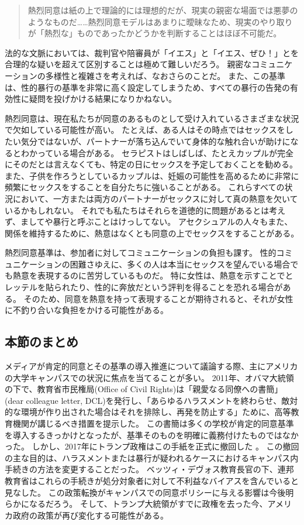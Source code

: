 \documentclass[paper=a4,book,openany]{jlreq} \usepackage{mystyle}
\begin{document}
\begin{quote}
熱烈同意は紙の上で理論的には理想的だが、現実の親密な場面では悪夢のようなものだ……熱烈同意モデルはあまりに曖昧なため、現実のやり取りが「熱烈な」ものであったかどうかを判断することはほぼ不可能だ。
\citep{zheng14:_how_ace_sex}

\end{quote}

法的な文脈においては、裁判官や陪審員が「イエス」と「イエス、ぜひ！」とを合理的な疑いを超えて区別することは極めて難しいだろう。
親密なコミュニケーションの多様性と複雑さを考えれば、なおさらのことだ。
また、この基準は、性的暴行の基準を非常に高く設定してしまうため、すべての暴行の告発の有効性に疑問を投げかける結果になりかねない。

熱烈同意は、現在私たちが同意のあるものとして受け入れているさまざまな状況で欠如している可能性が高い。
たとえば、ある人はその時点ではセックスをしたい気分ではないが、パートナーが落ち込んでいて身体的な触れ合いが助けになるとわかっている場合がある。
セラピストはしばしば、たとえカップルが完全にそのだとは言えなくても、特定の日にセックスを予定しておくことを勧める。
また、子供を作ろうとしているカップルは、妊娠の可能性を高めるために非常に頻繁にセックスをすることを自分たちに強いることがある。
これらすべての状況において、一方または両方のパートナーがセックスに対して真の熱意を欠いているかもしれない。
それでも私たちはそれらを道徳的に問題があるとは考えず、ましてや暴行と呼ぶことはけっしてない。
アセクシュアルの人々もまた、関係を維持するために、熱意はなくとも同意の上でセックスをすることがある。

熱烈同意基準は、参加者に対してコミュニケーションの負担も課す。
性的コミュニケーションの困難さゆえに、多くの人は本当にセックスを望んでいる場合でも熱意を表現するのに苦労しているものだ。
特に女性は、熱意を示すことでとレッテルを貼られたり、性的に奔放だという評判を得ることを恐れる場合がある。
そのため、同意を熱意を持って表現することが期待されると、それが女性に不釣り合いな負担をかける可能性がある。

\subsection{本節のまとめ}

メディアが肯定的同意とその基準の導入推進について議論する際、主にアメリカの大学キャンパスでの状況に焦点を当てることが多い。
2011年、オバマ大統領の下で、教育省市民権局(Office of Civil Rights)は「親愛なる同僚への書簡」(dear colleague letter, DCL)を発行し、「あらゆるハラスメントを終わらせ、敵対的な環境が作り出された場合はそれを排除し、再発を防止する」ために、高等教育機関が講じるべき措置を提示した。
この書簡は多くの学校が肯定的同意基準を導入するきっかけとなったが、基準そのものを明確に義務付けたものではなかった。
しかし、2017年にトランプ政権はこの手紙を正式に撤回した
\citep{melnick20:_analy_depar_educat_final_title}。
この撤回の主な目的は、ハラスメントまたは暴行が疑われるケースにおけるキャンパス内手続きの方法を変更することだった。
ベッツィ・デヴォス教育長官の下、連邦教育省はこれらの手続きが処分対象者に対して不利益なバイアスを含んでいると見なした。
この政策転換がキャンパスでの同意ポリシーに与える影響は今後明らかになるだろう。
そして、トランプ大統領がすでに政権を去った今、アメリカ政府の政策が再び変化する可能性がある。
\end{document}

